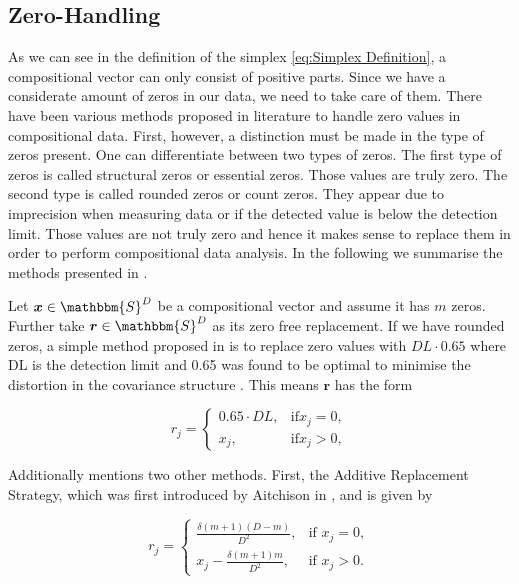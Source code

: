 \subsection{Zero-Handling}
\label{sec: Zero-Handling}

As we can see in the definition of the simplex \ref{eq:Simplex Definition}, a compositional vector can only consist of positive parts. Since we have a considerate amount of zeros in our data, we need to take care of them. There have been various methods proposed in literature to handle zero values in compositional data. First, however, a distinction must be made in the type of zeros present. One can differentiate between two types of zeros. The first type of zeros is called structural zeros or essential zeros. Those values are truly zero. The second type is called rounded zeros or count zeros. They appear due to imprecision when measuring data or if the detected value is below the detection limit. Those values are not truly zero and hence it makes sense to replace them in order to perform compositional data analysis. In the following we summarise the methods presented in \cite{Lubbe:2021,Josep:2003}. 


Let $\bm{x} \in \mathbbm{S}^D$ be a compositional vector and assume it has $m$ zeros. Further take $\bm{r} \in \mathbbm{S}^D$ as its zero free replacement. If we have rounded zeros, a simple method proposed in \cite{Josep:2003} is to replace zero values with $DL \cdot 0.65$ where DL is the detection limit and 0.65 was found to be optimal to minimise the distortion in the covariance structure \cite{Lubbe:2021}. This means $\bm{r}$ has the form

\begin{equation}
r_j = 
\begin{cases}
0.65\cdot DL, & \text{if} x_j=0, \\
x_j, & \text{if} x_j>0, 
\end{cases}
\label{eq:DL065}
\end{equation}

Additionally \cite{Josep:2003} mentions two other methods. First, the Additive Replacement Strategy, which was first introduced by Aitchison in \cite{Aitchison:1986}, and is given by

\begin{equation}
r_j = 
\begin{cases}
\frac{\delta(m+1)(D-m)}{D^2}, & \text{if } x_j=0, \\
x_j - \frac{\delta(m+1)m}{D^2}, & \text{if } x_j>0.
\end{cases}
\label{eq:additive replacement strategy}
\end{equation}

